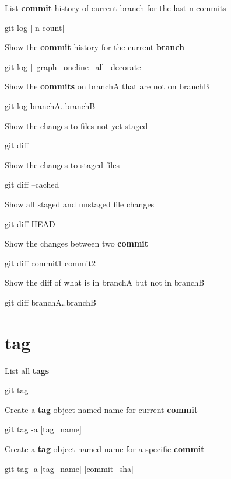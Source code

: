 \documentclass{refcard}
\begin{document}
List \textbf{commit} history of current branch for the last n commits
\begin{ttyenv}
git log [-n count]
\end{ttyenv}

Show the \textbf{commit} history for the current \textbf{branch}
\begin{ttyenv}
git log [--graph --oneline --all --decorate]
\end{ttyenv}

Show the \textbf{commits} on branchA that are not on branchB
\begin{ttyenv}
git log branchA..branchB
\end{ttyenv}

Show the changes to files not yet staged
\begin{ttyenv}
git diff
\end{ttyenv}

Show the changes to staged files
\begin{ttyenv}
git diff --cached
\end{ttyenv}

Show all staged and unstaged file changes
\begin{ttyenv}
git diff HEAD
\end{ttyenv}

Show the changes between two \textbf{commit}
\begin{ttyenv}
git diff commit1 commit2
\end{ttyenv}

Show the diff of what is in branchA but not in branchB
\begin{ttyenv}
git diff branchA..branchB
\end{ttyenv}

\section{tag}

List all \textbf{tags}
\begin{ttyenv}
git tag
\end{ttyenv}

Create a \textbf{tag} object named name for current \textbf{commit}
\begin{ttyenv}
git tag -a [tag_name]
\end{ttyenv}

Create a \textbf{tag} object named name for a specific \textbf{commit}
\begin{ttyenv}
git tag -a [tag_name] [commit_sha]
\end{ttyenv}
\end{document}
